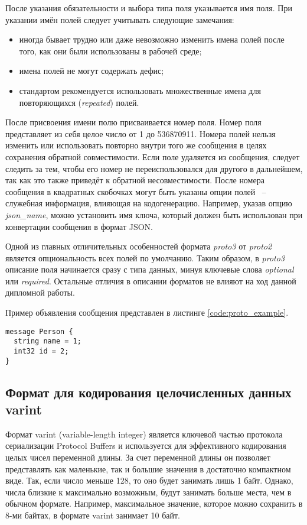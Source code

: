 После указания обязательности и выбора типа поля указывается имя поля. При указании имён полей следует учитывать следующие замечания:
\begin{itemize}
    \item иногда бывает трудно или даже невозможно изменить имена полей после того, как они были использованы в рабочей среде;
    \item имена полей не могут содержать дефис;
    \item стандартом рекомендуется использовать множественные имена для повторяющихся (\textit{repeated}) полей.
\end{itemize}

После присвоения имени полю присваивается номер поля. Номер поля представляет из себя целое число от 1 до 536870911.
Номера полей нельзя изменить или использовать повторно внутри того же сообщения в целях сохранения обратной совместимости.
Если поле удаляется из сообщения, следует следить за тем, чтобы его номер не переиспользовался для другого в дальнейшем, так как это также приведёт к обратной несовместимости.
После номера сообщения в квадратных скобочках могут быть указаны опции полей ~--~ служебная информация, влияющая на кодогенерацию. Например, указав опцию \textit{json\_name}, можно установить имя ключа, который должен быть использован при конвертации сообщения в формат JSON.

Одной из главных отличительных особенностей формата \textit{proto3} от \textit{proto2} является опциональность всех полей по умолчанию.
Таким образом, в \textit{proto3} описание поля начинается сразу с типа данных, минуя ключевые слова \textit{optional} или \textit{required}.
Остальные отличия в описании форматов не влияют на ход данной дипломной работы.

Пример объявления сообщения представлен в листинге \ref{code:proto_example}.

\begin{lstlisting}[style=CodeListing, label=code:proto_example, caption={Пример простейшего protobuf-сообщения}]
message Person {
  string name = 1;
  int32 id = 2;
}
\end{lstlisting}

\subsection{Формат для кодирования целочисленных данных varint}
Формат varint (variable-length integer) является ключевой частью протокола сериализации Protocol Buffers 
и используется для эффективного кодирования целых чисел переменной длины\cite{protobuf_encoding}. За счет переменной длины он позволяет 
представлять как маленькие, так и большие значения в достаточно компактном виде.
Так, если число меньше 128, то оно будет занимать лишь 1 байт. Однако, числа близкие к максимально возможным, 
будут занимать больше места, чем в обычном формате.
Например, максимальное значение, которое можно сохранить в 8-ми байтах, в формате varint занимает 10 байт.

